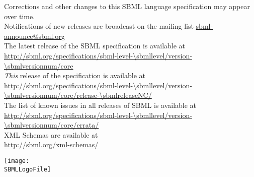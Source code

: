 \begin{center}
Corrections and other changes to this SBML language specification may appear over time.\\
Notifications of new releases are broadcast on the mailing list \href{http://www.sbml.org/forums}{sbml-announce@sbml.org}\\[10pt]

The latest release of the SBML \thisLV specification is available at\\
\url{http://sbml.org/specifications/sbml-level-\sbmllevel/version-\sbmlversionnum/core}\\[10pt]

\emph{This} release of the specification is available at\\
\url{http://sbml.org/specifications/sbml-level-\sbmllevel/version-\sbmlversionnum/core/release-\sbmlreleaseNC/}\\[10pt]

The list of known issues in all releases of SBML \thisLV is available at\\
\url{http://sbml.org/specifications/sbml-level-\sbmllevel/version-\sbmlversionnum/core/errata/}\\[10pt]

XML Schemas are available at\\
\url{http://sbml.org/xml-schemas/}\\[10pt]
\end{center}

\vfill

\centerline{\texttt{[image: \\SBMLLogoFile]}}
